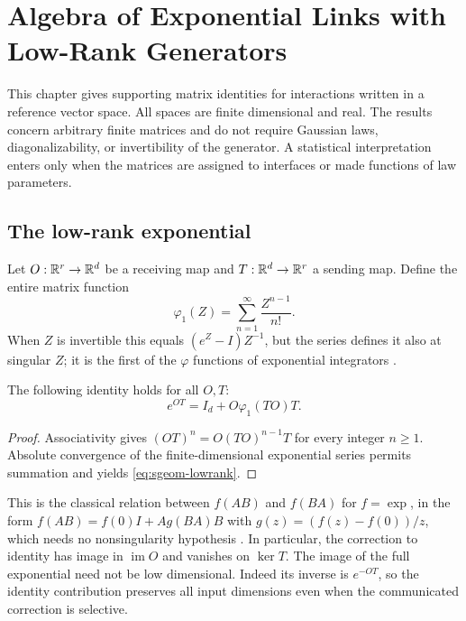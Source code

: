 \chapter{Algebra of Exponential Links with Low-Rank Generators}
\label{supp:geometry}

This chapter gives supporting matrix identities for interactions written in a reference vector space. All spaces are finite dimensional and real. The results concern arbitrary finite matrices and do not require Gaussian laws, diagonalizability, or invertibility of the generator. A statistical interpretation enters only when the matrices are assigned to interfaces or made functions of law parameters.

\section{The low-rank exponential}

Let $O:\mathbb R^r\to\mathbb R^d$ be a receiving map and $T:\mathbb R^d\to\mathbb R^r$ a sending map. Define the entire matrix function
\begin{equation}
\varphi_1(Z)=\sum_{n=1}^{\infty}\frac{Z^{n-1}}{n!}.
\end{equation}
When $Z$ is invertible this equals $(e^Z-I)Z^{-1}$, but the series defines it also at singular $Z$; it is the first of the $\varphi$ functions of exponential integrators \citep[Chapter~10]{Higham2008}.

The following identity holds for all $O,T$:
\begin{equation}
e^{OT}=I_d+O\varphi_1(TO)T.
\label{eq:sgeom-lowrank}
\end{equation}
\begin{proof}
Associativity gives $(OT)^n=O(TO)^{n-1}T$ for every integer $n\geq1$. Absolute convergence of the finite-dimensional exponential series permits summation and yields \cref{eq:sgeom-lowrank}.
\end{proof}
This is the classical relation between $f(AB)$ and $f(BA)$ for $f=\exp$, in the form $f(AB)=f(0)I+Ag(BA)B$ with $g(z)=(f(z)-f(0))/z$, which needs no nonsingularity hypothesis \citep[Section~1.8]{Higham2008}.
In particular, the correction to identity has image in $\operatorname{im}O$ and vanishes on $\ker T$. The image of the full exponential need not be low dimensional. Indeed its inverse is $e^{-OT}$, so the identity contribution preserves all input dimensions even when the communicated correction is selective.

